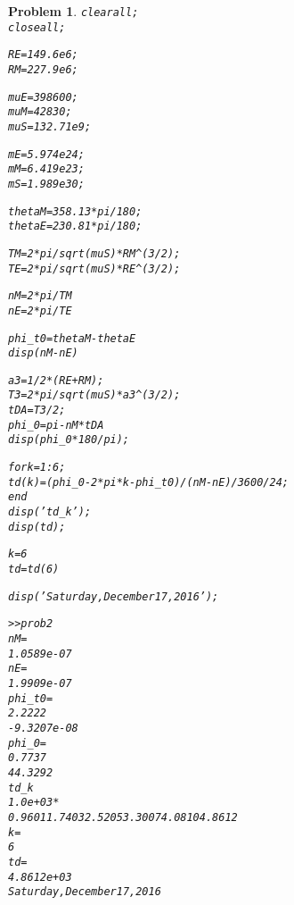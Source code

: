 \documentclass[10pt]{article}
\renewcommand{\baselinestretch}{1.2}
\theoremstyle{plain}\theorembodyfont{\normalfont}
\newtheorem{prob}{Problem}[section]
\newenvironment{matlab}
{\begin{alltt}\small\renewcommand{\baselinestretch}{1.2}\selectfont}%
{\end{alltt}}
\begin{document}
\begin{prob}

\begin{matlab}
clear all;
close all;

RE=149.6e6;
RM=227.9e6;

muE=398600;
muM=42830;
muS=132.71e9;

mE=5.974e24;
mM=6.419e23;
mS=1.989e30;

thetaM=358.13*pi/180;
thetaE=230.81*pi/180;

TM=2*pi/sqrt(muS)*RM^(3/2);
TE=2*pi/sqrt(muS)*RE^(3/2);

nM=2*pi/TM
nE=2*pi/TE

phi_t0=thetaM-thetaE
disp(nM-nE)

a3=1/2*(RE+RM);
T3=2*pi/sqrt(muS)*a3^(3/2);
tDA=T3/2;
phi_0=pi-nM*tDA
disp(phi_0*180/pi);

for k=1:6;
    td(k)=(phi_0-2*pi*k-phi_t0)/(nM-nE)/3600/24;
end
disp('td_k');
disp(td);

k=6
td=td(6)

disp('Saturday, December 17, 2016');

>> prob2
nM =
   1.0589e-07
nE =
   1.9909e-07
phi_t0 =
    2.2222    
  -9.3207e-08
phi_0 =
    0.7737
   44.3292
td_k
   1.0e+03 *
    0.9601    1.7403    2.5205    3.3007    4.0810    4.8612
k =
     6
td =
   4.8612e+03
Saturday, December 17, 2016
\end{matlab}
\end{prob}
\end{document}
